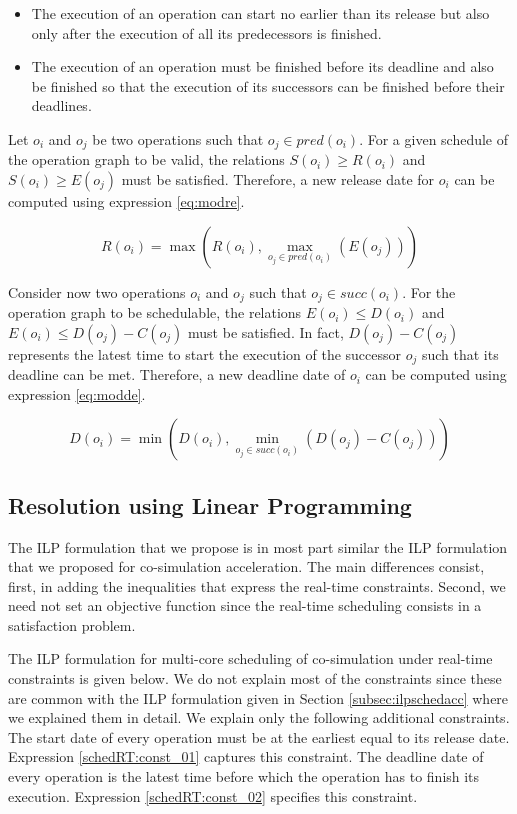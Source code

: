 \begin{itemize}

\item The execution of an operation can start no earlier than its release but also only after the execution of all its predecessors is finished.

\item The execution of an operation must be finished before its deadline and also be finished so that the execution of its successors can be finished before their deadlines.

\end{itemize}

Let $o_i$ and $o_j$ be two operations such that $o_j \in pred(o_i)$. For a given schedule of the operation graph to be valid, the relations $S(o_i) \geq R(o_i)$ and $S(o_i) \geq E(o_j)$ must be satisfied. Therefore, a new release date for $o_i$ can be computed using expression \ref{eq:modre}.

\begin{equation} 
R(o_i) = \max(R(o_i), \max_{o_j \in pred(o_i)}(E(o_j)))
\label{eq:modre}
\end{equation}

Consider now two operations $o_i$ and $o_j$ such that $o_j \in succ(o_i)$. For the operation graph to be schedulable, the relations $E(o_i) \leq D(o_i)$ and $E(o_i) \leq D(o_j) - C(o_j)$ must be satisfied. In fact, $D(o_j) - C(o_j)$ represents the latest time to start the execution of the successor $o_j$ such that its deadline can be met. Therefore, a new deadline date of $o_i$ can be computed using expression \ref{eq:modde}.

\begin{equation} 
D(o_i) = \min(D(o_i), \min_{o_j \in succ(o_i)}(D(o_j) - C(o_j)))
\label{eq:modde}
\end{equation} 

\subsection{Resolution using Linear Programming}

The ILP formulation that we propose is in most part similar the ILP formulation that we proposed for co-simulation acceleration. The main differences consist, first, in adding the inequalities that express the real-time constraints. Second, we need not set an objective function since the real-time scheduling consists in a satisfaction problem.

The ILP formulation for multi-core scheduling of co-simulation under real-time constraints is given below. We do not explain most of the constraints since these are common with the ILP formulation given in Section \ref{subsec:ilpschedacc} where we explained them in detail. We explain only the following additional constraints. The start date of every operation must be at the earliest equal to its release date. Expression \ref{schedRT:const_01} captures this constraint. The deadline date of every operation is the latest time before which the operation has to finish its execution. Expression \ref{schedRT:const_02} specifies this constraint.

